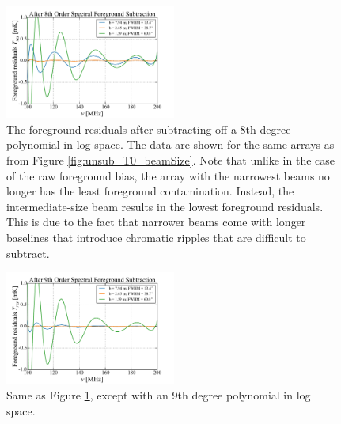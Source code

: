 \documentclass[twocolumn,apj,numberedappendix]{emulateapj}
\newcommand{\acl}[1]{}
\begin{document}
\begin{figure}[h]
	\centering
	\includegraphics[width=0.50\textwidth] {figures/subPoly8_T0_beamSize.pdf}
	\caption{\acl{Changed figure and caption} The foreground residuals after subtracting off a $8$th degree polynomial in log space. The data are shown for the same arrays as from Figure \ref{fig:unsub_T0_beamSize}. Note that unlike in the case of the raw foreground bias, the array with the narrowest beams no longer has the least foreground contamination. Instead, the intermediate-size beam results in the lowest foreground residuals. This is due to the fact that narrower beams come with longer baselines that introduce chromatic ripples that are difficult to subtract.}
	\label{fig:subPoly8_T0_beamSize}
\end{figure}

\begin{figure}[h]
	\centering
	\includegraphics[width=0.50\textwidth] {figures/subPoly9_T0_beamSize.pdf}
	\caption{\acl{Changed figure and caption} Same as Figure \ref{fig:subPoly8_T0_beamSize}, except with an $9$th degree polynomial in log space.}
	\label{fig:subPoly9_T0_beamSize}
\end{figure}

\end{document}
